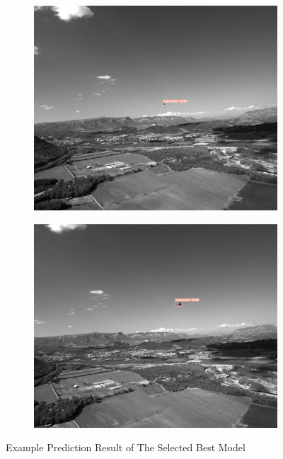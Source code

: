 \begin{figure}[btp]
  \begin{subfigure}{.45\textwidth}
    \centering
    \includegraphics[width = \linewidth]{figures/best-2.png}
  \end{subfigure}\hspace{1ex}
  \begin{subfigure}{.45\textwidth}
    \centering
    \includegraphics[width = \linewidth]{figures/best-3.png}
  \end{subfigure}
  \caption{Example Prediction Result of The Selected Best Model}
  \label{fig:inference-out}
\end{figure}
